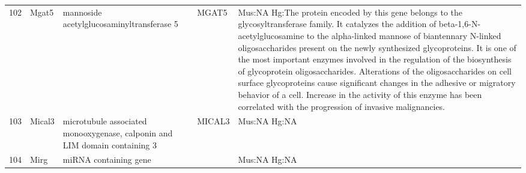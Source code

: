 \documentclass[11pt, landscape]{article}   	%
\begin{document}
\begin{table}[ht]
\begin{tabular}{rlp{3cm}lp{12cm}}
  102 & Mgat5 & mannoside acetylglucosaminyltransferase 5 & MGAT5 & Mus:NA Hg:The protein encoded by this gene belongs to the glycosyltransferase family. It catalyzes the addition of beta-1,6-N-acetylglucosamine to the alpha-linked mannose of biantennary N-linked oligosaccharides present on the newly synthesized glycoproteins. It is one of the most important enzymes involved in the regulation of the biosynthesis of glycoprotein oligosaccharides. Alterations of the oligosaccharides on cell surface glycoproteins cause significant changes in the adhesive or migratory behavior of a cell. Increase in the activity of this enzyme has been correlated with the progression of invasive malignancies. \\ 
  103 & Mical3 & microtubule associated monooxygenase, calponin and LIM domain containing 3 & MICAL3 & Mus:NA Hg:NA \\ 
  104 & Mirg & miRNA containing gene &  & Mus:NA Hg:NA \\ 

   \hline
\end{tabular}
\end{table}
\end{document}
